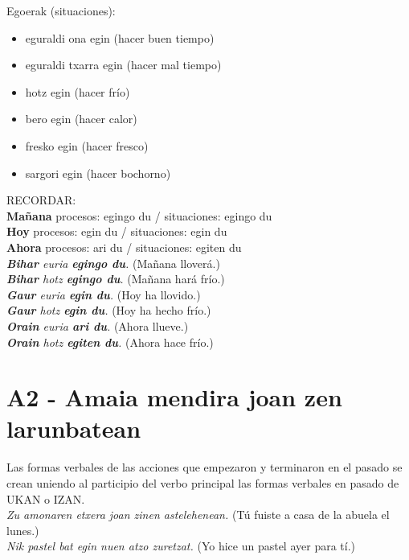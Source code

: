 \documentclass[11pt, a4paper]{article}
\begin{document}
\noindent Egoerak (situaciones):
\begin{multicols}{2}
\begin{itemize}
\item eguraldi ona egin (hacer buen tiempo)
\item eguraldi txarra egin (hacer mal tiempo)
\item hotz egin (hacer frío)
\item bero egin (hacer calor)
\item fresko egin (hacer fresco)
\item sargori egin (hacer bochorno)
\end{itemize}
\end{multicols}

\noindent RECORDAR: \\
\textbf{Mañana} procesos: egingo du / situaciones: egingo du\\
\textbf{Hoy} procesos: egin du / situaciones: egin du\\
\textbf{Ahora} procesos: ari du / situaciones: egiten du\\


\indent \textit{\textbf{Bihar} euria \textbf{egingo du}.}
(Mañana lloverá.)\\
\indent \textit{\textbf{Bihar} hotz \textbf{egingo du}.}
(Mañana hará frío.)\\
\indent \textit{\textbf{Gaur} euria \textbf{egin du}.}
(Hoy ha llovido.)\\
\indent \textit{\textbf{Gaur} hotz \textbf{egin du}.}
(Hoy ha hecho frío.)\\
\indent \textit{\textbf{Orain} euria \textbf{ari du}.}
(Ahora llueve.)\\
\indent \textit{\textbf{Orain} hotz \textbf{egiten du}.}
(Ahora hace frío.)\\

\section{A2 - Amaia mendira joan zen larunbatean}
Las formas verbales de las acciones que empezaron y terminaron en el pasado se crean uniendo al participio del verbo principal las formas verbales en pasado de UKAN o IZAN.\\
\indent \textit{Zu amonaren etxera joan zinen astelehenean.}
(Tú fuiste a casa de la abuela el lunes.)\\
\indent \textit{Nik pastel bat egin nuen atzo zuretzat.}
(Yo hice un pastel ayer para tí.)\\
\end{document}
